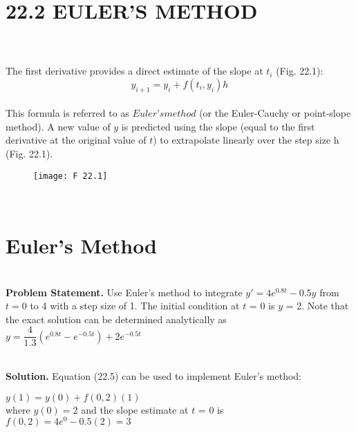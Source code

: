 \vspace{0,6in}
\chapter{22.2 EULER’S METHOD}
\vspace{0,1in}
\hline\\
\vspace{0,1in}\\
The first derivative provides a direct estimate of the slope at $t_{i}$ (Fig. 22.1):
\begin{equation}
\tag{22.5}
y_{i+1} = y_{i} + f(t_{i},y_{i})h
\end{equation}\\
This formula is referred to as $Euler’s method$ (or the Euler-Cauchy or point-slope method).
A new value of $y$ is predicted using the slope (equal to the first derivative at the original
value of $t$) to extrapolate linearly over the step size h (Fig. 22.1).\\
\begin{figure}[hbt!]
	\texttt{[image: F 22.1]}
	\label{F 22.1}
\end{figure}\\

\vspace{0,3in}
\chapter{Euler’s Method}
\vspace{0,1in}
\hline\\
\vspace{0,1in}
\textbf{Problem Statement.} Use Euler’s method to integrate $y' = 4e^{0.8t} - 0.5y$ from $t = 0$ to 4 with a step size of 1. The initial condition at $t$ = 0 is $y$ = 2. Note that the exact solution can
be determined analytically as\\

$y= \dfrac{4}{1.3} (e^{0.8t} - e^{-0.5t}) + 2e^{-0.5t} $

\vspace{0.2in}\\
\textbf{Solution.} Equation (22.5) can be used to implement Euler’s method:

$y(1) = y(0) + f(0,2)(1)$\\

where $y(0) = 2$ and the slope estimate at $t$ = 0 is\\

$f(0,2) = 4e^0 - 0.5(2) = 3$\\

